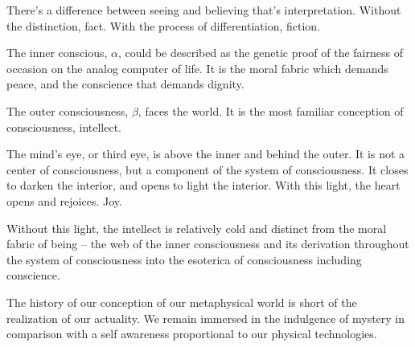 

﻿There's a difference between seeing and believing that's
interpretation.  Without the distinction, fact.  \break With the
process of differentiation, fiction.

The inner conscious, $\alpha$, could be described as the genetic proof
of the fairness of occasion on the analog computer of life.  It is the
moral fabric which demands peace, and the conscience that demands
dignity.

The outer consciousness, $\beta$, faces the world.  It is the most
familiar conception of consciousness, intellect.

The mind's eye, or third eye, is above the inner and behind the outer.
It is not a center of consciousness, but a component of the system of
consciousness.  It closes to darken the interior, and opens to light
the interior.  With this light, the heart opens and rejoices.  Joy.

Without this light, the intellect is relatively cold and distinct from
the moral fabric of being -- the web of the inner consciousness and
its derivation throughout the system of consciousness into the
esoterica of consciousness including conscience.

The history of our conception of our metaphysical world is short of
the realization of our actuality.  We remain immersed in the
indulgence of mystery in comparison with a self awareness proportional
to our physical technologies.

\bye
